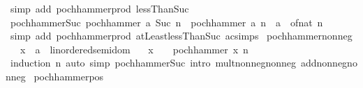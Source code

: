 \begin{isabellebody}
%
\isatagproof
{}\isamarkupfalse%
\ {\isacharparenleft}{\kern0pt}simp\ add{\isacharcolon}{\kern0pt}\ pochhammer{\isacharunderscore}{\kern0pt}prod\ lessThan{\isacharunderscore}{\kern0pt}Suc{\isacharparenright}{\kern0pt}%
\endisatagproof
{\isafoldproof}%
%
\isadelimproof
\isanewline
%
\endisadelimproof
\isanewline
{}\isamarkupfalse%
\ pochhammer{\isacharunderscore}{\kern0pt}Suc{\isacharcolon}{\kern0pt}\ {\isachardoublequoteopen}pochhammer\ a\ {\isacharparenleft}{\kern0pt}Suc\ n{\isacharparenright}{\kern0pt}\ {\isacharequal}{\kern0pt}\ pochhammer\ a\ n\ {\isacharasterisk}{\kern0pt}\ {\isacharparenleft}{\kern0pt}a\ {\isacharplus}{\kern0pt}\ of{\isacharunderscore}{\kern0pt}nat\ n{\isacharparenright}{\kern0pt}{\isachardoublequoteclose}\isanewline
%
\isadelimproof
\ \ %
\endisadelimproof
%
\isatagproof
{}\isamarkupfalse%
\ {\isacharparenleft}{\kern0pt}simp\ add{\isacharcolon}{\kern0pt}\ pochhammer{\isacharunderscore}{\kern0pt}prod\ atLeast{}{\isacharunderscore}{\kern0pt}lessThan{\isacharunderscore}{\kern0pt}Suc\ ac{\isacharunderscore}{\kern0pt}simps{\isacharparenright}{\kern0pt}%
\endisatagproof
{\isafoldproof}%
%
\isadelimproof
\isanewline
%
\endisadelimproof
\isanewline
{}\isamarkupfalse%
\isanewline
\isanewline
{}\isamarkupfalse%
\ pochhammer{\isacharunderscore}{\kern0pt}nonneg{\isacharcolon}{\kern0pt}\isanewline
\ \ \ x\ {\isacharcolon}{\kern0pt}{\isacharcolon}{\kern0pt}\ {\isachardoublequoteopen}{\isacharprime}{\kern0pt}a\ {\isacharcolon}{\kern0pt}{\isacharcolon}{\kern0pt}\ linordered{\isacharunderscore}{\kern0pt}semidom{\isachardoublequoteclose}\isanewline
\ \ \ {\isachardoublequoteopen}x\ {\isachargreater}{\kern0pt}\ {}\ {\isasymLongrightarrow}\ pochhammer\ x\ n\ {\isasymge}\ {}{\isachardoublequoteclose}\isanewline
%
\isadelimproof
\ \ %
\endisadelimproof
%
\isatagproof
{}\isamarkupfalse%
\ {\isacharparenleft}{\kern0pt}induction\ n{\isacharparenright}{\kern0pt}\ {\isacharparenleft}{\kern0pt}auto\ simp{\isacharcolon}{\kern0pt}\ pochhammer{\isacharunderscore}{\kern0pt}Suc\ intro{\isacharbang}{\kern0pt}{\isacharcolon}{\kern0pt}\ mult{\isacharunderscore}{\kern0pt}nonneg{\isacharunderscore}{\kern0pt}nonneg\ add{\isacharunderscore}{\kern0pt}nonneg{\isacharunderscore}{\kern0pt}nonneg{\isacharparenright}{\kern0pt}%
\endisatagproof
{\isafoldproof}%
%
\isadelimproof
\isanewline
%
\endisadelimproof
\isanewline
{}\isamarkupfalse%
\ pochhammer{\isacharunderscore}{\kern0pt}pos{\isacharcolon}{\kern0pt}\isanewline

\end{isabellebody}
